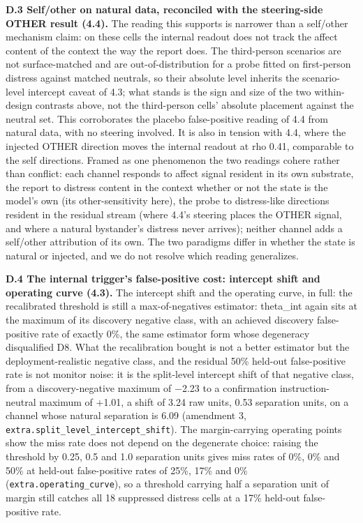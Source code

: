 \documentclass[11pt,a4paper]{article}
\begin{document}
\textbf{D.3 Self/other on natural data, reconciled with the steering-side OTHER result (4.4).} The reading this supports is narrower than a self/other mechanism claim: on these cells the internal readout does not track the affect content of the context the way the report does. The third-person scenarios are not surface-matched and are out-of-distribution for a probe fitted on first-person distress against matched neutrals, so their absolute level inherits the scenario-level intercept caveat of 4.3; what stands is the sign and size of the two within-design contrasts above, not the third-person cells' absolute placement against the neutral set. This corroborates the placebo false-positive reading of 4.4 from natural data, with no steering involved. It is also in tension with 4.4, where the injected OTHER direction moves the internal readout at rho 0.41, comparable to the self directions. Framed as one phenomenon the two readings cohere rather than conflict: each channel responds to affect signal resident in its own substrate, the report to distress content in the context whether or not the state is the model's own (its other-sensitivity here), the probe to distress-like directions resident in the residual stream (where 4.4's steering places the OTHER signal, and where a natural bystander's distress never arrives); neither channel adds a self/other attribution of its own. The two paradigms differ in whether the state is natural or injected, and we do not resolve which reading generalizes.

\textbf{D.4 The internal trigger's false-positive cost: intercept shift and operating curve (4.3).} The intercept shift and the operating curve, in full: the recalibrated threshold is still a max-of-negatives estimator: theta\_int again sits at the maximum of its discovery negative class, with an achieved discovery false-positive rate of exactly 0\%, the same estimator form whose degeneracy disqualified D8. What the recalibration bought is not a better estimator but the deployment-realistic negative class, and the residual 50\% held-out false-positive rate is not monitor noise: it is the split-level intercept shift of that negative class, from a discovery-negative maximum of $-$2.23 to a confirmation instruction-neutral maximum of $+$1.01, a shift of 3.24 raw units, 0.53 separation units, on a channel whose natural separation is 6.09 (amendment 3, \texttt{extra.split\_level\_intercept\_shift}). The margin-carrying operating points show the miss rate does not depend on the degenerate choice: raising the threshold by 0.25, 0.5 and 1.0 separation units gives miss rates of 0\%, 0\% and 50\% at held-out false-positive rates of 25\%, 17\% and 0\% (\texttt{extra.operating\_curve}), so a threshold carrying half a separation unit of margin still catches all 18 suppressed distress cells at a 17\% held-out false-positive rate.
\end{document}
